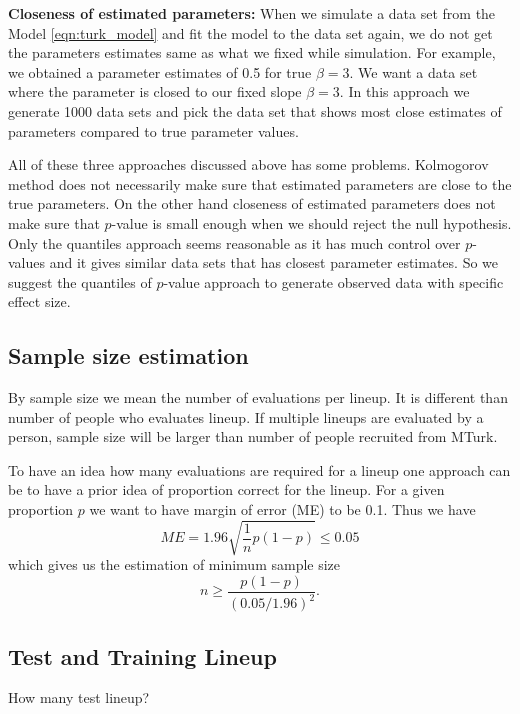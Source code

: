 \documentclass[11pt]{article}
\begin{document}
{\bf Closeness of estimated parameters:} When we simulate a data set from the Model \eqref{eqn:turk_model} and fit the model to the data set again, we do not get the parameters estimates same as what we fixed while simulation. For example, we obtained a parameter estimates of 0.5 for true $\beta=3$. We want a data set where the parameter is closed to our fixed slope $\beta=3$.  In this approach we generate 1000 data sets and pick the data set that shows most close estimates of parameters compared to true parameter values.

All of these three approaches discussed above has some problems. Kolmogorov method does not necessarily make sure that estimated parameters are close to the true parameters. On the other hand closeness of estimated parameters does not make sure that $p$-value is small enough when we should reject the null hypothesis. Only the quantiles approach seems reasonable as it has much control over $p$-values and it gives similar data sets that has closest parameter estimates. So we suggest the quantiles of $p$-value approach to generate observed data with specific effect size.

\subsection{Sample size estimation} By sample size we mean the number of evaluations per lineup. It is different than number of people who evaluates lineup. If multiple lineups are evaluated by a person, sample size will be larger than number of people recruited from MTurk. 

To have an idea how many evaluations are required for a lineup one approach can be to have a prior idea of proportion correct for the lineup. For a given proportion $p$ we want to have margin of error (ME) to be 0.1. Thus we have $$ME =1.96 \sqrt{ \frac 1 n p(1-p)} \le 0.05$$ which gives us the estimation of minimum sample size $$n \geq \frac{p(1-p)}{(0.05/1.96)^2}.$$ 




\subsection{Test and Training Lineup} How many test lineup?
\end{document}
